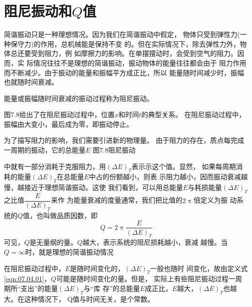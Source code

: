 \section{阻尼振动和$ Q $值}\label{sec:07.04}

简谐振动只是一种理想情况。因为我们在简谐振动中假定，
物体只受到弹性力(一种保守力)的作用，总机械能是保持不变
的。但在实际情况下，除去弹性力外，物体总还要受到阻力，例
如摩擦力的影响。在单摆摆动时，会受到空气的阻力。因而，实
际情况往往不是理想的简谐振动，振动物体的能量往往都会由于
阻力作用而不断减少。由于振动的能量和振幅平方成正比，所以
能量随时间减少时，振幅也就随时间衰减。

能量或振幅随时间衰减的振动过程称为阻尼振动。

图7.8给出了在阻尼振动过程中，位置$ x $和时间$ t $的典型关系。
在阻尼振动过程中，振幅由大变小，最后成为零，即振动停止。

为了描写阻力的影响，我们需要引进新的物理量。
由于阻力的存在，质点每完成一周期的振动，它的总能量$ E $
图7.8阻尼振动

中就有一部分消耗于克服阻力，用$ ( \Delta E ) _ { T } $表示示这个值。显然，
如果每周期消耗的能量$ ( \Delta E ) _ { T } $在总能量$ E $中占的份额越小，则表
示阻力越小，因而振动衰减越慢，越接近于理想简谐振动。这使
我们看到，可以用总能量$ E $与耗损能量$ ( \Delta E ) _ { T } $之比值$ \dfrac { E } { ( \Delta E ) _ { T } } $来作
为能量衰减的度量通常，我们把比值的$ 2 \uppi $倍定义为振
动系统的$ Q $值，也叫做品质因数，即
\begin{equation}\label{eqn:07.04.01}
    Q = 2 \uppi \frac { E } { ( \Delta E ) _ { T } }
\end{equation}
可见，$ Q $是无量纲的量。$ Q $越大，表示系统的阻尼损耗越小，衰减
越慢。当$ Q = \infty $时，就是理想的简谐振动情况

在阻尼振动过程中，$ E $是随时间变化的，$ ( \Delta E ) _ { T } $一般也随时
间变化，故由定义\lhbrak 式\ref{eqn:07.04.01}\rhbrak ，$ Q $可能是随时间变化的量。但是，
实际上有些阻尼振动过程一周期所“支出”的能量$ ( \Delta E ) _ { T } $与“库
存”的总能量$ E $成正比，$ E $越大，$ ( \Delta E ) _ { T } $也越大。在这种情况下，
Q值与时间无关，是个常数。

